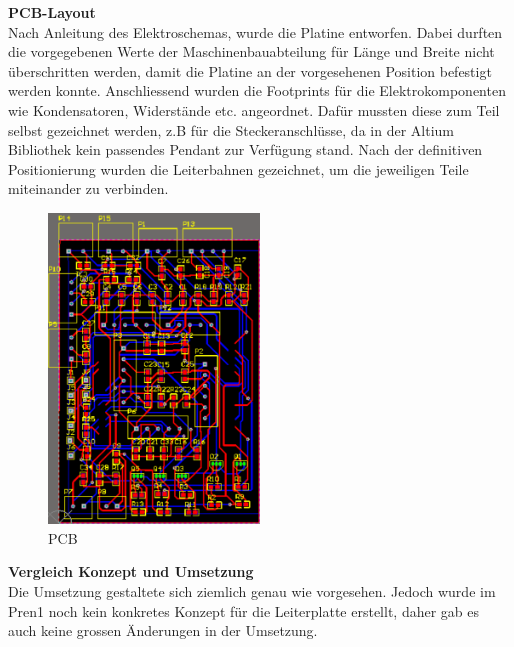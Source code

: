 \textbf{PCB-Layout}
\\[0.2cm]
Nach Anleitung des Elektroschemas, wurde die Platine entworfen. Dabei durften die vorgegebenen Werte der Maschinenbauabteilung für Länge und Breite nicht überschritten werden, damit die Platine an der vorgesehenen Position befestigt werden konnte. Anschliessend wurden die Footprints für die Elektrokomponenten wie Kondensatoren, Widerstände etc. angeordnet. Dafür mussten diese zum Teil selbst gezeichnet werden, z.B für die Steckeranschlüsse, da in der Altium Bibliothek kein passendes Pendant zur Verfügung stand.
Nach der definitiven Positionierung wurden die Leiterbahnen gezeichnet, um die jeweiligen Teile miteinander zu verbinden.
\\[0.2cm]
\begin{figure}[H]
\centering
\includegraphics[width=0.5\textwidth]{03_Loesungskonzept/pictures/pcb_print.png}
\caption{PCB}	
\end{figure}
\textbf{Vergleich Konzept und Umsetzung}\\[0.2cm]
Die Umsetzung gestaltete sich ziemlich genau wie vorgesehen. Jedoch wurde im Pren1 noch kein konkretes Konzept für die Leiterplatte erstellt, daher gab es auch keine grossen Änderungen in der Umsetzung.
